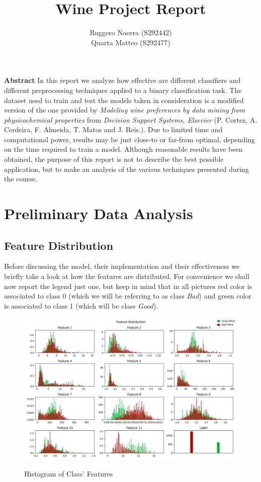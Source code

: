 \documentclass[12pt, twocolumn]{article}
\title{Wine Project Report}
\author{Ruggero Nocera (S292442) \\ Quarta Matteo (S292477)}
\date{}
\begin{document}
\maketitle
\begin{strip}
    {\bf Abstract}
    In this report we analyze how effective are different classifiers and different preprocessing techniques applied to a binary classification task.
    The dataset used to train and test the models taken in consideration is a modified version of
    the one provided by {\it Modeling wine preferences by data mining from physicochemical properties}
    from {\it Decision Support Systems, Elsevier} (P. Cortez, A. Cerdeira, F. Almeida, T. Matos and J. Reis.).
    Due to limited time and computational power, results may be just close-to or far-from optimal, depending on the time required to train a model.
    Although reasonable results have been obtained, the purpose of this report is not to describe the best possible application,
    but to make an analysis of the various techniques presented during the course.

\end{strip}
\tableofcontents


\section{Preliminary Data Analysis}
\subsection{Feature Distribution}

Before discussing the model, their implementation and their effectiveness we briefly take a look at how the features are distributed.
For convenience we shall now report the legend just one, but keep in mind that in all pictures red color is associated to class 0 (which we will be referring to as class {\it Bad}) and green color is associated to class 1 (which will be class {\it Good}).

\begin{figure}[H] 
    \caption{Histogram of Class' Features}
    \label{fig:disthist}
    {\includegraphics[width=\linewidth]{dist.jpg}}
\end{figure}
\end{document}

